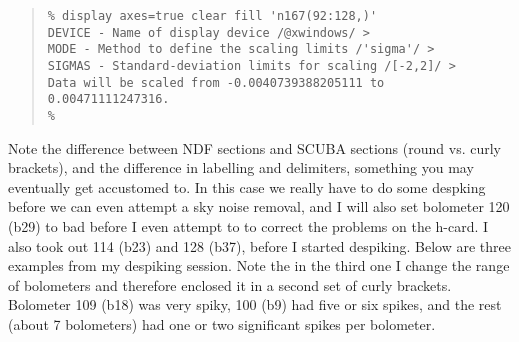 \documentclass[twoside,11pt]{article}
\newenvironment{myquote}{\begin{quote}\begin{small}}{\end{small}\end{quote}}
\begin{document}
\begin{myquote} \begin{verbatim}
% display axes=true clear fill 'n167(92:128,)'
DEVICE - Name of display device /@xwindows/ > 
MODE - Method to define the scaling limits /'sigma'/ > 
SIGMAS - Standard-deviation limits for scaling /[-2,2]/ > 
Data will be scaled from -0.0040739388205111 to 0.00471111247316.
% 
\end{verbatim} \end{myquote}

Note the difference between NDF sections and SCUBA sections (round
vs. curly brackets), and the difference in labelling and delimiters,
something you may eventually get accustomed to. In this case we really
have to do some despking before we can even attempt a sky noise removal,
and I will also set bolometer 120 (b29) to bad before I even attempt
to to correct the problems on the h-card. I also took out 114 (b23)
and 128 (b37), before I started despiking. Below are three examples
from my despiking session. Note the in the third one I change the
range of bolometers and therefore enclosed it in a second set of curly
brackets. Bolometer 109 (b18) was very spiky, 100 (b9) had five or six
spikes, and the rest (about 7 bolometers) had one or two significant
spikes per bolometer. 
\end{document}
